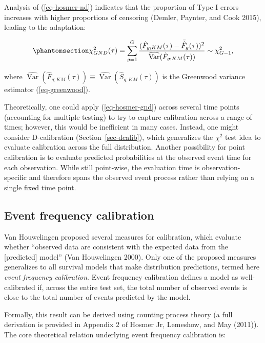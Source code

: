 \documentclass[
  letterpaper,
  krantz2]{style/krantz}
\begin{document}
Analysis of (\ref{eq-hosmer-nd}) indicates that the proportion of Type I
errors increases with higher proportions of censoring (Demler, Paynter,
and Cook 2015), leading to the
adaptation:

\begin{equation}\phantomsection\label{eq-hosmer-gnd}{
\chi^2_{GND}(\tau) = \sum^G_{g=1} \frac{(\hat{F}_{g;KM}(\tau) - \bar{\hat{F}}_{g}(\tau))^2}{\widehat{\operatorname{Var}}(\hat{F}_{g;KM}(\tau))} \sim \chi^2_{G-1},
}\end{equation}

where
\(\widehat{\operatorname{Var}}(\hat{F}_{g;KM}(\tau)) \equiv \widehat{\operatorname{Var}}(\hat{S}_{g;KM}(\tau))\)
is the Greenwood variance estimator
(\ref{eq-greenwood}).

Theoretically, one could apply (\ref{eq-hosmer-gnd}) across several time
points (accounting for multiple testing) to try to capture calibration
across a range of times; however, this would be inefficient in many
cases. Instead, one might consider D-calibration
(Section~\ref{sec-dcalib}), which generalizes the \(\chi^2\) test idea
to evaluate calibration across the full distribution. Another
possibility for point calibration is to evaluate predicted probabilities
at the observed event time for each observation. While still point-wise,
the evaluation time is observation-specific and therefore spans the
observed event process rather than relying on a single fixed time point.

\subsection{Event frequency calibration}\label{sec-alpha}

Van Houwelingen proposed several measures for calibration, which
evaluate whether ``observed data are consistent with the expected data
from the {[}predicted{]} model'' (Van Houwelingen
2000). Only one of the proposed
measures generalizes to all survival models that make distribution
predictions, termed here \emph{event frequency
calibration}. Event frequency
calibration defines a model as well-calibrated if, across the entire
test set, the total number of observed events is close to the total
number of events predicted by the model.

Formally, this result can be derived using counting
process theory (a full derivation is provided in
Appendix 2 of Hosmer Jr, Lemeshow, and May (2011)). The core theoretical
relation underlying event frequency calibration is:
\end{document}
